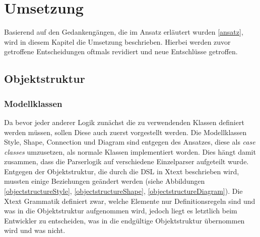 \chapter{Umsetzung}
Basierend auf den Gedankengängen, die im Ansatz erläutert wurden \ref{ansatz}, wird in diesem Kapitel die Umsetzung beschrieben. Hierbei werden zuvor getroffene Entscheidungen oftmals revidiert und neue Entschlüsse getroffen.
\section{Objektstruktur}
\subsection{Modellklassen}
Da bevor jeder anderer Logik zunächst die zu verwendenden Klassen definiert werden müssen, sollen Diese auch zuerst vorgestellt werden.
Die Modellklassen Style, Shape, Connection und Diagram sind entgegen des Ansatzes, diese als \textit{case classes} umzusetzen, als normale Klassen implementiert worden. Dies hängt damit zusammen, dass die Parserlogik auf verschiedene Einzelparser aufgeteilt wurde.
Entgegen der Objektstruktur, die durch die DSL in Xtext beschrieben wird, mussten einige Beziehungen geändert werden (siehe Abbildungen \ref{objectstructureStyle}, \ref{objectstructureShape}, \ref{objectstructureDiagram}).
Die Xtext Grammatik definiert zwar, welche Elemente nur Definitionsregeln sind und was in die Objektstruktur aufgenommen wird, jedoch liegt es letztlich beim Entwickler zu entscheiden, was in die endgültige Objektstruktur übernommen wird und was nicht.
